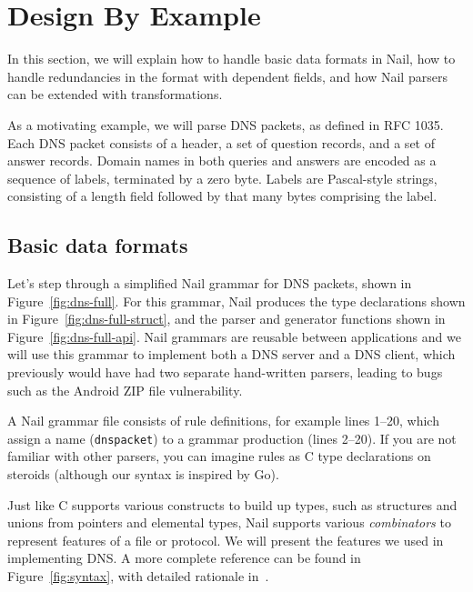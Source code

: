 \section{Design By Example}
In this section, we will explain how to handle basic data formats in Nail, how to handle
redundancies in the format with dependent fields, and how Nail parsers can be extended with
transformations. 

As a motivating example, we will parse DNS packets, as defined in RFC 1035. Each DNS packet consists of a
header, a set of question records, and a set of answer records. Domain
names in both queries and answers are encoded as a sequence of labels,
terminated by a zero byte.  Labels are Pascal-style strings, consisting
of a length field followed by that many bytes comprising the label.
\label{s:design}
\subsection{Basic data formats}


Let's step through a simplified Nail grammar for DNS
packets, shown in  Figure~\ref{fig:dns-full}.  For this grammar, Nail produces the type declarations
shown in Figure~\ref{fig:dns-full-struct}, and the parser and
generator functions shown in Figure~\ref{fig:dns-full-api}.
Nail grammars are reusable between applications and we will use this grammar to implement
both a DNS server and a DNS client, which previously would have had two separate hand-written parsers,
leading to bugs such as the Android ZIP file vulnerability.

A Nail grammar file consists of rule definitions, for example lines 1--20,  which assign a name
(\texttt{dnspacket}) to a grammar production (lines 2--20). If you are not familiar with
other parsers, you can imagine rules as C type declarations on steroids
(although our syntax is inspired by Go).

Just like C supports various constructs to build up types, such as structures and unions from pointers and
elemental types, Nail supports various \emph{combinators} to represent features of a file or protocol. We will present the features we used in implementing
DNS\@. A more complete reference can be found in Figure~\ref{fig:syntax}, with detailed rationale in~\cite{bangert:nail}.



